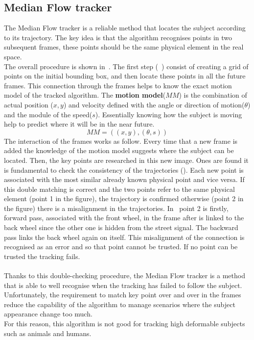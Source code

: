 \subsection{Median Flow tracker} \label{sec:medianflow}
The Median Flow tracker\cite{medianFlow} is a reliable method that locates the subject according to its trajectory. The key idea is that the algorithm recognises points in two subsequent frames, these points should be the same physical element in the real space.\\
The overall procedure is shown in~. The first step (~) consist of creating a grid of points on the initial bounding box, and then locate these points in all the future frames. This connection through the frames helps to know the exact motion model of the tracked algorithm. The \textbf{motion model}($MM$) is the combination of actual position ($x, y$) and velocity defined with the angle or direction of motion($\theta$) and the module of the speed($s$). Essentially knowing how the subject is moving help to predict where it will be in the near future.
$$MM = ((x, y), (\theta, s))$$
The interaction of the frames works as follow. Every time that a new frame is added the knowledge of the motion model suggests where the subject can be located. Then, the key points are researched in this new image. Ones are found it is fundamental to check the consistency of the trajectories (). Each new point is associated with the most similar already known physical point and vice versa. If this double matching is correct and the two points refer to the same physical element (point 1 in the figure), the trajectory is confirmed otherwise (point 2 in the figure) there is a misalignment in the trajectories. In~ point 2 is firstly, forward pass, associated with the front wheel, in the frame after is linked to the back wheel since the other one is hidden from the street signal. The backward pass links the back wheel again on itself. This misalignment of the connection is recognised as an error and so that point cannot be trusted. If no point can be trusted the tracking fails.\\
\\
Thanks to this double-checking procedure, the Median Flow tracker is a method that is able to well recognise when the tracking has failed to follow the subject. Unfortunately, the requirement to match key point over and over in the frames reduce the capability of the algorithm to manage scenarios where the subject appearance change too much.\\
For this reason, this algorithm is not good for tracking high deformable subjects such as animals and humans.

